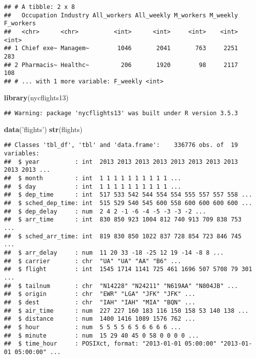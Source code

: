 \documentclass[]{article}
\newenvironment{Shaded}{\begin{snugshade}}{\end{snugshade}}
\newcommand{\KeywordTok}[1]{\textcolor[rgb]{0.13,0.29,0.53}{\textbf{#1}}}
\newcommand{\StringTok}[1]{\textcolor[rgb]{0.31,0.60,0.02}{#1}}
\newcommand{\NormalTok}[1]{#1}
\begin{document}
\begin{verbatim}
## # A tibble: 2 x 8
##   Occupation Industry All_workers All_weekly M_workers M_weekly F_workers
##   <chr>      <chr>          <int>      <int>     <int>    <int>     <int>
## 1 Chief exe~ Managem~        1046       2041       763     2251       283
## 2 Pharmacis~ Healthc~         206       1920        98     2117       108
## # ... with 1 more variable: F_weekly <int>
\end{verbatim}

\begin{Shaded}
\begin{Highlighting}[]
\KeywordTok{library}\NormalTok{(nycflights13)}
\end{Highlighting}
\end{Shaded}

\begin{verbatim}
## Warning: package 'nycflights13' was built under R version 3.5.3
\end{verbatim}

\begin{Shaded}
\begin{Highlighting}[]
\KeywordTok{data}\NormalTok{(}\StringTok{'flights'}\NormalTok{)}
\KeywordTok{str}\NormalTok{(flights)}
\end{Highlighting}
\end{Shaded}

\begin{verbatim}
## Classes 'tbl_df', 'tbl' and 'data.frame':    336776 obs. of  19 variables:
##  $ year          : int  2013 2013 2013 2013 2013 2013 2013 2013 2013 2013 ...
##  $ month         : int  1 1 1 1 1 1 1 1 1 1 ...
##  $ day           : int  1 1 1 1 1 1 1 1 1 1 ...
##  $ dep_time      : int  517 533 542 544 554 554 555 557 557 558 ...
##  $ sched_dep_time: int  515 529 540 545 600 558 600 600 600 600 ...
##  $ dep_delay     : num  2 4 2 -1 -6 -4 -5 -3 -3 -2 ...
##  $ arr_time      : int  830 850 923 1004 812 740 913 709 838 753 ...
##  $ sched_arr_time: int  819 830 850 1022 837 728 854 723 846 745 ...
##  $ arr_delay     : num  11 20 33 -18 -25 12 19 -14 -8 8 ...
##  $ carrier       : chr  "UA" "UA" "AA" "B6" ...
##  $ flight        : int  1545 1714 1141 725 461 1696 507 5708 79 301 ...
##  $ tailnum       : chr  "N14228" "N24211" "N619AA" "N804JB" ...
##  $ origin        : chr  "EWR" "LGA" "JFK" "JFK" ...
##  $ dest          : chr  "IAH" "IAH" "MIA" "BQN" ...
##  $ air_time      : num  227 227 160 183 116 150 158 53 140 138 ...
##  $ distance      : num  1400 1416 1089 1576 762 ...
##  $ hour          : num  5 5 5 5 6 5 6 6 6 6 ...
##  $ minute        : num  15 29 40 45 0 58 0 0 0 0 ...
##  $ time_hour     : POSIXct, format: "2013-01-01 05:00:00" "2013-01-01 05:00:00" ...
\end{verbatim}
\end{document}
